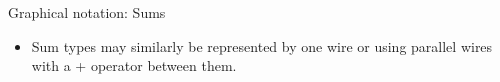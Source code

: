 \documentclass[11pt]{beamer}
\begin{document}
\begin{frame}{Graphical notation: Sums} 

\begin{itemize}
\item  Sum types may similarly be represented by one wire or using
  parallel wires with a {{+}} operator between them. 
\end{itemize}

\begin{multicols}{2}
\begin{center}
\end{center}
\begin{center}
\end{center}
\end{multicols}
\vfill
\begin{multicols}{2}
\begin{center}
\end{center}
\begin{center}
\end{center}
\end{multicols}

\end{frame}
\end{document}
